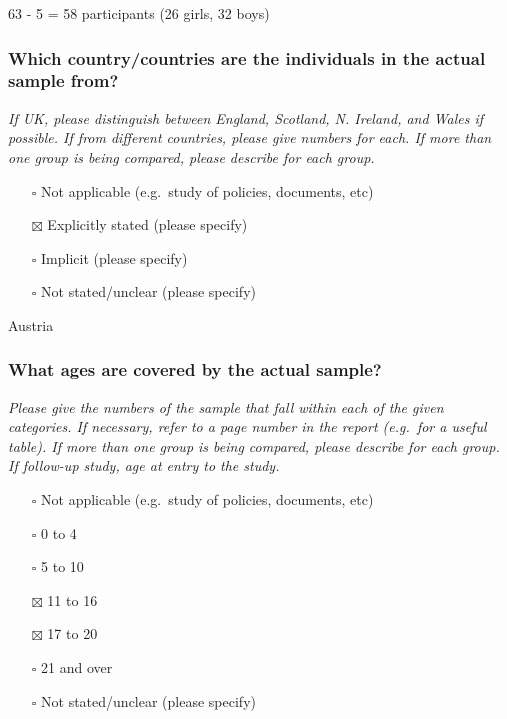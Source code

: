 \documentclass[
  doc, a4paper]{apa7}
\providecommand{\tightlist}{%
  \setlength{\itemsep}{0pt}\setlength{\parskip}{0pt}}
\begin{document}
63 - 5 = 58 participants (26 girls, 32 boys)

\subsubsection{Which country/countries are the individuals in the actual sample from?}\label{which-countrycountries-are-the-individuals-in-the-actual-sample-from}

\emph{If UK, please distinguish between England, Scotland, N. Ireland, and Wales if possible. If from different countries, please give numbers for each. If more than one group is being compared, please describe for each group.}

\begin{itemize}
\tightlist
\item[$\square$]
  Not applicable (e.g.~study of policies, documents, etc)
\item[$\boxtimes$]
  Explicitly stated (please specify)
\item[$\square$]
  Implicit (please specify)
\item[$\square$]
  Not stated/unclear (please specify)
\end{itemize}

Austria

\subsubsection{What ages are covered by the actual sample?}\label{what-ages-are-covered-by-the-actual-sample}

\emph{Please give the numbers of the sample that fall within each of the given categories. If necessary, refer to a page number in the report (e.g.~for a useful table). If more than one group is being compared, please describe for each group. If follow-up study, age at entry to the study.}

\begin{itemize}
\tightlist
\item[$\square$]
  Not applicable (e.g.~study of policies, documents, etc)
\item[$\square$]
  0 to 4
\item[$\square$]
  5 to 10
\item[$\boxtimes$]
  11 to 16
\item[$\boxtimes$]
  17 to 20
\item[$\square$]
  21 and over
\item[$\square$]
  Not stated/unclear (please specify)
\end{itemize}
\end{document}
